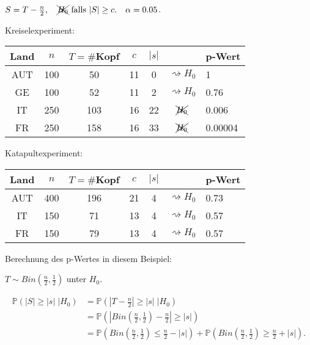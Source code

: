\documentclass{tstextbook}
\newcommand{\Prob}{\mathbb P}
\begin{document}
\begin{example}
	$ S=T-\frac{n}{2}, \quad \xcancel{H_0} \text{ falls } |S|\ge c. \quad \alpha = 0.05 $.
	
	Kreiselexperiment:
	\vspace{0.5cm}
\begin{center}	
	\begin{tabular}{c|c|c|c|c|c|l}
		Land 	& $ n $ 	& $ T=\# $Kopf 	& $ c $ 	& $ |s| $ 	& & p-Wert \\
		\midrule
		AUT		& 100		& 50 			& 11		& 0						& $ \rightsquigarrow H_0 $ & 1 \\
		GE		& 100		& 52 			& 11		& 2						& $ \rightsquigarrow H_0 $ & 0.76 \\
		IT		& 250		& 103 			& 16		& 22					& $ \xcancel{H_0} $ & 0.006 \\
		FR		& 250		& 158 			& 16		& 33					& $ \xcancel{H_0} $ & 0.00004 \\
	\end{tabular}
\end{center}
	\vspace{0.5cm}
	
	Katapultexperiment:
		\vspace{0.5cm}
\begin{center}	
	\begin{tabular}{c|c|c|c|c|c|l}
		Land 	& $ n $ 	& $ T=\# $Kopf 	& $ c $ 	& $ |s| $ 	& & p-Wert \\
		\midrule
		AUT		& 400		& 196 			& 21		& 4					& $ \rightsquigarrow H_0 $ & 0.73 \\
		IT		& 150		& 71 			& 13		& 4					& $ \rightsquigarrow H_0 $ & 0.57 \\
		FR		& 150		& 79 			& 13		& 4					& $ \rightsquigarrow H_0 $ & 0.57 \\
	\end{tabular}
\end{center}
	\vspace{0.5cm}
	
	Berechnung des p-Wertes in diesem Beispiel:
	
	$ T\sim Bin\left(\frac{n}{2}, \frac{1}{2}\right) $ unter $ H_0 $. 
	
	\[
	\begin{aligned}
		\Prob\left(|S|\ge |s| \; |H_0\right) & = \Prob\left(|T-\frac{n}{2}|\ge |s| \; |H_0\right) \\
		& = \Prob\left(|Bin\left(\frac{n}{2}, \frac{1}{2}\right)-\frac{n}{2}|\ge|s|\right) \\
		& = \Prob\left(Bin\left(\frac{n}{2}, \frac{1}{2}\right)\le\frac{n}{2}-|s|\right) + \Prob\left(Bin\left(\frac{n}{2}, \frac{1}{2}\right)\ge\frac{n}{2}+|s|\right).
	\end{aligned}
	\]
\end{example}
\end{document}
